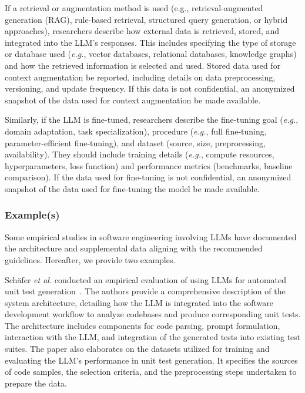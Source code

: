 
If a retrieval or augmentation method is used (e.g., retrieval-augmented generation (RAG), rule-based retrieval, structured query generation, or hybrid approaches), researchers \must describe how external data is retrieved, stored, and integrated into the LLM's responses. This includes specifying the type of storage or database used (\textit{e.g.}, vector databases, relational databases, knowledge graphs) and how the retrieved information is selected and used. Stored data used for context augmentation \must be reported, including details on data preprocessing, versioning, and update frequency. If this data is not confidential, an anonymized snapshot of the data used for context augmentation \should be made available.

Similarly, if the LLM is fine-tuned, researchers \must describe the fine-tuning goal (\textit{e.g.}, domain adaptation, task specialization), procedure (\textit{e.g.}, full fine-tuning, parameter-efficient fine-tuning), and dataset (source, size, preprocessing, availability). They should include training details (\textit{e.g.}, compute resources, hyperparameters, loss function) and performance metrics (benchmarks, baseline comparison). If the data used for fine-tuning is not confidential, an anonymized snapshot of the data used for fine-tuning the model \should be made available.

\subsubsection{Example(s)}

Some empirical studies in software engineering involving LLMs have documented the architecture and supplemental data aligning with the recommended guidelines. Hereafter, we provide two examples.


Sch{\"{a}}fer \textit{et al.} conducted an empirical evaluation of using LLMs for automated unit test generation~\cite{DBLP:journals/tse/SchaferNET24}. The authors provide a comprehensive description of the system architecture, detailing how the LLM is integrated into the software development workflow to analyze codebases and produce corresponding unit tests. The architecture includes components for code parsing, prompt formulation, interaction with the LLM, and integration of the generated tests into existing test suites. The paper also elaborates on the datasets utilized for training and evaluating the LLM's performance in unit test generation. It specifies the sources of code samples, the selection criteria, and the preprocessing steps undertaken to prepare the data.

